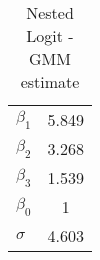 \begin{table}[htb]
\centering
\caption{Nested Logit - GMM estimate}\label{tab:gmm}
\begin{tabular}{lc}
 \hline 
$\beta_1$ & 5.849 \\ 
$\beta_2$ & 3.268 \\ 
$\beta_3$ & 1.539 \\ 
$\beta_0$ & 1 \\ 
$\sigma$ & 4.603 \\ 
\hline
\end{tabular}
\end{table}

